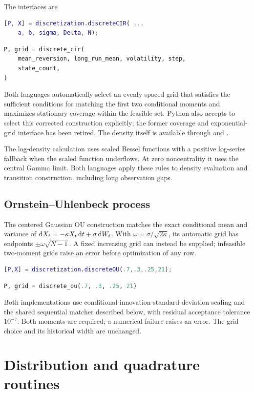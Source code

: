 The interfaces are
\begin{lstlisting}[language=Matlab]
[P, X] = discretization.discreteCIR( ...
    a, b, sigma, Delta, N);
\end{lstlisting}
\begin{lstlisting}[language=Python]
P, grid = discrete_cir(
    mean_reversion, long_run_mean, volatility, step,
    state_count,
)
\end{lstlisting}
Both languages automatically select an evenly spaced grid that satisfies
the sufficient conditions for matching the first two conditional moments and
maximizes stationary coverage within the feasible set. Python also accepts
 to select this corrected construction explicitly; the
former coverage and exponential-grid interface has been retired. The density
itself is available through  and
.

The log-density calculation uses scaled Bessel functions with a positive
log-series fallback when the scaled function underflows. At zero noncentrality
it uses the central Gamma limit. Both languages apply these rules to density
evaluation and transition construction, including long observation gaps.

\subsection{Ornstein--Uhlenbeck process}

The centered Gaussian OU construction matches the exact conditional mean and
variance of $\mathop{}\!\mathrm{d} X_t=-\kappa X_t\mathop{}\!\mathrm{d} t+\sigma\mathop{}\!\mathrm{d} W_t$. With
$\omega=\sigma/\sqrt{2\kappa}$, its automatic grid has endpoints
$\pm\omega\sqrt{N-1}$. A fixed increasing grid can instead be supplied;
infeasible two-moment grids raise an error before optimization of any row.
\begin{lstlisting}[language=Matlab]
[P,X] = discretization.discreteOU(.7,.3,.25,21);
\end{lstlisting}
\begin{lstlisting}[language=Python]
P, grid = discrete_ou(.7, .3, .25, 21)
\end{lstlisting}
Both implementations use conditional-innovation-standard-deviation scaling
and the shared sequential matcher described below, with residual acceptance
tolerance $10^{-7}$. Both moments are required; a numerical failure raises an
error. The grid choice and its historical width are unchanged.

\section{Distribution and quadrature routines}

